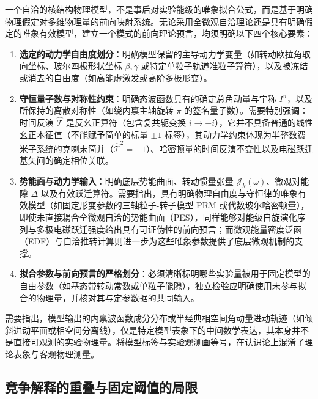 一个自洽的核结构物理模型，不是事后对实验能级的唯象拟合公式，而是基于明确物理假定对多维物理量的前向映射系统。无论采用全微观自洽理论还是具有明确假定的唯象有效模型，建立一个模式的前向理论预言，均须明确以下四个核心要素：
\begin{enumerate}
\item \textbf{选定的动力学自由度划分}：明确模型保留的主导动力学变量（如转动欧拉角取向坐标、玻尔四极形状坐标 $\beta, \gamma$ 或特定单粒子轨道准粒子算符），以及被冻结或消去的自由度（如高能虚激发或高阶多极形变）。
\item \textbf{守恒量子数与对称性约束}：明确态波函数具有的确定总角动量与宇称 $I^\pi$，以及所保持的离散对称性（如绕内禀主轴旋转 $\pi$ 的签名量子数）。需要特别强调：时间反演 $\hat{\mathcal{T}}$ 是反幺正算符（包含复共轭变换 $i \to -i$），它并不具备普通的线性幺正本征值（不能赋予简单的标量 $\pm 1$ 标签），其动力学约束体现为半整数费米子系统的克喇末简并（$\hat{\mathcal{T}}^2 = -1$）、哈密顿量的时间反演不变性以及电磁跃迁基矢间的确定相位关联。
\item \textbf{势能面与动力学输入}：明确底层势能曲面、转动惯量张量 $\mathcal{J}_k(\omega)$、微观对能隙 $\Delta$ 以及有效跃迁算符。需要指出，具有明确物理自由度与守恒律的唯象有效模型（如固定形变参数的三轴粒子-转子模型 PRM 或代数玻尔哈密顿量），即使未直接耦合全微观自洽的势能曲面（PES），同样能够对能级自旋演化序列与多极电磁跃迁强度给出具有可证伪性的前向预言；而微观能量密度泛函（EDF）与自洽推转计算则进一步为这些唯象参数提供了底层微观机制的支撑。
\item \textbf{拟合参数与前向预言的严格划分}：必须清晰标明哪些实验量被用于固定模型的自由参数（如基态带转动常数或单粒子能隙），独立检验应明确使用未参与拟合的物理量，并核对其与定参数据的共同输入。
\end{enumerate}

需要指出，模型输出的内禀波函数成分分布或半经典相空间角动量进动轨迹（如倾斜进动平面或相空间分离线），仅是特定模型表象下的中间数学表达，其本身并不是直接可观测的实验物理量。将模型标签与实验观测画等号，在认识论上混淆了理论表象与客观物理测量。

\subsection{竞争解释的重叠与固定阈值的局限}\label{sec:3-8-2}


